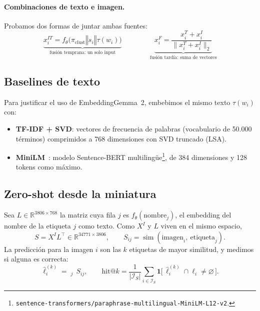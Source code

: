\documentclass[11pt,a4paper]{article}
\newcommand{\R}{\mathbb{R}}
\newcommand{\concat}{\mathbin{\Vert}}
\newcommand{\simil}{\operatorname{sim}}
\DeclareMathOperator*{\topk}{top_{\mathit{k}}}
\begin{document}
\paragraph{Combinaciones de texto e imagen.}
Probamos dos formas de juntar ambas fuentes:
\[
  \underbrace{x_i^{IT} = f_\theta\big(\pi_{\mathrm{clust}} \concat s_i \concat \tau(w_i)\big)}_{\text{fusión temprana: un solo input}}
  \qquad\qquad
  \underbrace{x_i^{F} = \frac{x_i^{T} + x_i^{I}}{\big\|x_i^{T} + x_i^{I}\big\|_2}}_{\text{fusión tardía: suma de vectores}}
\]

\subsection{Baselines de texto}
Para justificar el uso de EmbeddingGemma~2, embebimos el mismo texto $\tau(w_i)$ con:
\begin{itemize}
  \item \textbf{TF-IDF + SVD}: vectores de frecuencia de palabras (vocabulario de 50.000
        términos) comprimidos a 768 dimensiones con SVD truncado (LSA).
  \item \textbf{MiniLM}~\cite{sbert,sbert-multi}: modelo Sentence-BERT multilingüe\footnote{\texttt{sentence-transformers/paraphrase-multilingual-MiniLM-L12-v2}.},
        de 384 dimensiones y 128 tokens
        como máximo.
\end{itemize}

\subsection{Zero-shot desde la miniatura}
Sea $L \in \R^{3806 \times 768}$ la matriz cuya fila $j$ es $f_\theta(\mathrm{nombre}_j)$, el
embedding del nombre de la etiqueta $j$ como texto. Como $X^{I}$ y $L$ viven en el mismo
espacio,
\[
  S = X^{I} L^{\top} \in \R^{34771 \times 3806}, \qquad
  S_{ij} = \simil(\text{imagen}_i,\ \text{etiqueta}_j).
\]
La predicción para la imagen $i$ son las $k$ etiquetas de mayor similitud, y medimos si
alguna es correcta:
\[
  \hat{\ell}_i^{(k)} = \topk_{j}\, S_{ij}, \qquad
  \text{hit@}k = \frac{1}{|\mathcal{I}_S|} \sum_{i \in \mathcal{I}_S}
  \mathbf{1}\big[\, \hat{\ell}_i^{(k)} \cap \ell_i \neq \varnothing \,\big].
\]
\end{document}
